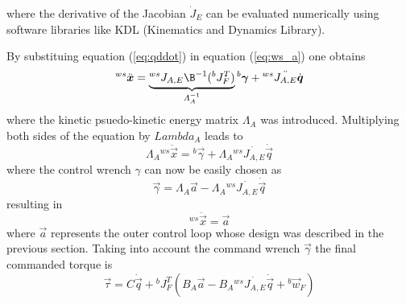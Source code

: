 where the derivative of the Jacobian $\dot{J}_{E}$ can be evaluated numerically
using software libraries like KDL (Kinematics and Dynamics Library).
\par
By substituing equation (\ref{eq:qddot}) in equation (\ref{eq:ws_a}) one obtains
\begin{equation*}
  {}^{ws} \ddot{\vec{x}} = \underbrace{{}^{ws} J_{A,E} \B^{-1} ({}^b J_{F}^T)}_{\Lambda_A^{-1}} {}^b \vec{\gamma} + {}^{ws} \ddot{J_{A,E}} \dot{\vec{q}}
\end{equation*}
where the kinetic psuedo-kinetic energy matrix $\Lambda_{A}$ was introduced. Multiplying both sides of the equation
by $Lambda_{A}$ leads to
\begin{equation*}
  \Lambda_A {}^{ws} \ddot{\vec{x}} =  {}^b \vec{\gamma} +  \Lambda_A  {}^{ws} \dot{J_{A,E}} \dot{\vec{q}}
\end{equation*}
where the control wrench $\gamma$ can now be easily chosen as
\begin{equation*}\label{eq:gamma}
  \vec{\gamma} = \Lambda_A \vec{a} - \Lambda_A {}^{ws} \dot{J_{A,E}} \dot{\vec{q}}
\end{equation*}
resulting in
\begin{equation*}
  {}^{ws}\ddot{\vec{x}} = \vec{a}
\end{equation*}
where $\vec{a}$ represents the outer control loop whose design was described in the previous
section. Taking into account the command wrench $\vec{\gamma}$ the final commanded torque is
\begin{equation}\label{eq:torque_wo_null}
  \vec{\tau} = C \dot{\vec{q}} + {}^{b}J^{T}_{F} ( B_A \vec{a} - B_A {}^{ws} \dot{J_{A,E}} \dot{\vec{q}} + {}^b\vec{w}_{F})
\end{equation}

